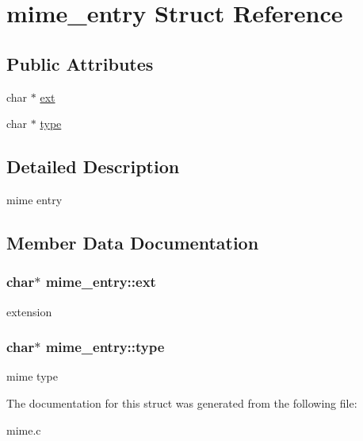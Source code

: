 \hypertarget{structmime__entry}{
\section{mime\_\-entry Struct Reference}
\label{structmime__entry}
}
\subsection*{Public Attributes}
\begin{DoxyCompactItemize}
\item 
char $\ast$ \hyperlink{structmime__entry_a07d5763e7e0f1b9a5e5141de26a98df0}{ext}
\item 
char $\ast$ \hyperlink{structmime__entry_a858822668050c7cf50116fde8f11c58d}{type}
\end{DoxyCompactItemize}


\subsection{Detailed Description}
mime entry 

\subsection{Member Data Documentation}
\hypertarget{structmime__entry_a07d5763e7e0f1b9a5e5141de26a98df0}{
\subsubsection[{ext}]{\setlength{\rightskip}{0pt plus 5cm}char$\ast$ {\bf mime\_\-entry::ext}}}
\label{structmime__entry_a07d5763e7e0f1b9a5e5141de26a98df0}
extension \hypertarget{structmime__entry_a858822668050c7cf50116fde8f11c58d}{
\subsubsection[{type}]{\setlength{\rightskip}{0pt plus 5cm}char$\ast$ {\bf mime\_\-entry::type}}}
\label{structmime__entry_a858822668050c7cf50116fde8f11c58d}
mime type 

The documentation for this struct was generated from the following file:\begin{DoxyCompactItemize}
\item 
mime.c\end{DoxyCompactItemize}
